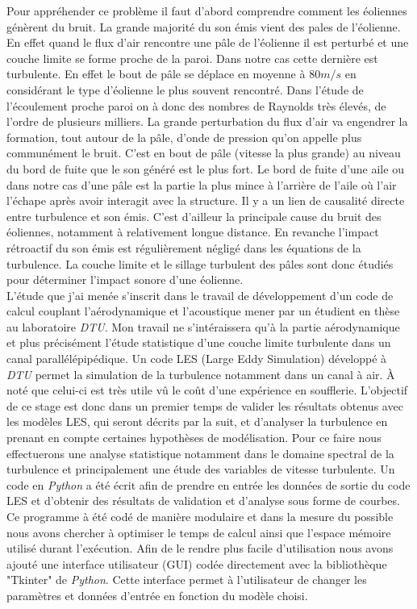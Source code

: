 \documentclass[12pt]{article}   %
\theoremstyle{plain}
\theoremstyle{remark}
\begin{document}
	Pour appréhender ce problème il faut d'abord comprendre comment les éoliennes génèrent du bruit. La grande majorité du son émis vient des pales de l'éolienne. En effet quand le flux d'air rencontre une pâle de l'éolienne il est perturbé et une couche limite se forme proche de la paroi. Dans notre cas cette dernière est turbulente. En effet le bout de pâle se déplace en moyenne à $80 m/s$ en considérant le type d'éolienne le plus souvent rencontré. Dans l'étude de l'écoulement proche paroi on à donc des nombres  de Raynolds très élevés, de l'ordre de plusieurs milliers. La grande perturbation du flux d'air va engendrer la formation, tout autour de la pâle, d'onde de pression qu'on appelle plus communément le bruit. C'est en bout de pâle (vitesse la plus grande) au niveau du bord de fuite que le son généré est le plus fort. Le bord de fuite d'une aile ou dans notre cas d'une pâle est la partie la plus mince à l'arrière de l'aile où l'air l'échape après avoir interagit avec la structure. Il y a un lien de causalité directe entre turbulence et son émis. C'est d'ailleur la principale cause du bruit des éoliennes, notamment à relativement longue distance. En revanche l'impact rétroactif du son émis est régulièrement négligé dans les équations de la turbulence. La couche limite et le sillage turbulent des pâles sont donc étudiés pour déterminer l'impact sonore d'une éolienne.\\
	
	L'étude que j'ai menée s'inscrit dans le travail de développement d'un code de calcul couplant l'aérodynamique et l'acoustique mener par un étudient en thèse au laboratoire \textit{DTU}. Mon travail ne s'intéraissera qu'à la partie aérodynamique et plus précisément l'étude statistique d'une couche limite turbulente dans un canal parallélépipédique. Un code LES (Large Eddy Simulation) développé à \textit{DTU} permet la simulation de la turbulence notamment dans un canal à air. À noté que celui-ci est très utile vû le coût d'une expérience en soufflerie. L'objectif de ce stage est donc dans un premier temps de valider les résultats obtenus avec les modèles LES, qui seront décrits par la suit, et d'analyser la turbulence en prenant en compte certaines hypothèses de modélisation. Pour ce faire nous effectuerons une analyse statistique notamment dans le domaine spectral de la turbulence et principalement une étude des variables de vitesse turbulente. Un code en \textit{Python} a été écrit afin de prendre en entrée les données de sortie du code LES et d'obtenir des résultats de validation et d'analyse sous forme de courbes. Ce programme à été codé de manière modulaire et dans la mesure du possible nous avons chercher à optimiser le temps de calcul ainsi que l'espace mémoire utilisé durant l'exécution. Afin de le rendre plus facile d'utilisation nous avons ajouté une interface utilisateur (GUI) codée directement avec la bibliothèque "Tkinter" de \textit{Python}. Cette interface permet à l'utilisateur de changer les paramètres et données d'entrée en fonction du modèle choisi.\\
	
\end{document}
